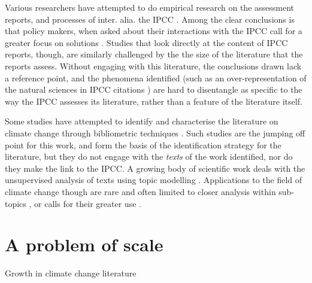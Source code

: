 \documentclass{article}
\begin{document}
\begin{linenumbers}


Various researchers have attempted to do empirical research on the assessment reports, and processes of inter. alia. the IPCC \citep{jabbour2017, Bjurström2011, Corbera2016, Hulme2016}. Among the clear conclusions is that policy makers, when asked about their interactions with the IPCC call for a greater focus on solutions \citep{Kowarsch2017}. Studies that look directly at the content of IPCC reports, though, are similarly challenged by the the size of the literature that the reports assess. Without engaging with this literature, the conclusions drawn lack a reference point, and the phenomena identified (such as an over-representation of the natural sciences in IPCC citations \cite{Bjurström2011}) are hard to disentangle as specific to the way the IPCC assesses its literature, rather than a feature of the literature itself. 


Some studies have attempted to identify and characterise the literature on climate change through bibliometric techniques \citep{Haunschild2016, Grieneisen2011}. Such studies are the jumping off point for this work, and form the basis of the identification strategy for the literature, but they do not engage with the \textit{texts} of the work identified, nor do they make the link to the IPCC. A growing body of scientific work deals with the unsupervised analysis of texts using topic modelling \cite{Lee1999,Blei2003, Greene2016, Roberts2013}. Applications to the field of climate change though are rare and often limited to closer analysis within sub-topics \cite{Grubert2017}, or calls for their greater use \cite{Grubert2016}. 

\section*{A problem of scale}



\begin{table}
	\scriptsize
	
	\caption{Growth in climate change literature}
	\label{growthtable}
\end{table}


\end{linenumbers}
\end{document}
